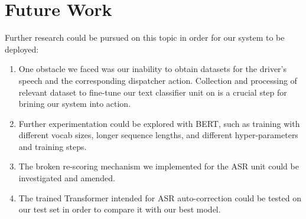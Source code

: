 \section{Future Work}
\label{conc:s2}

Further research could be pursued on this topic in order for our system to be deployed:

\begin{enumerate}
	\item One obstacle we faced was our inability to obtain datasets for the driver's speech and the corresponding dispatcher action. Collection and processing of relevant dataset to fine-tune our text classifier unit on is a crucial step for brining our system into action. 
	\item Further experimentation could be explored with \ac{BERT}, such as training with different vocab sizes, longer sequence lengths, and different hyper-parameters and training steps.
	\item The broken re-scoring mechanism we implemented for the \ac{ASR} unit could be investigated and amended.
	\item The trained Transformer intended for \ac{ASR} auto-correction could be tested on our test set in order to compare it with our best model.

\end{enumerate}


